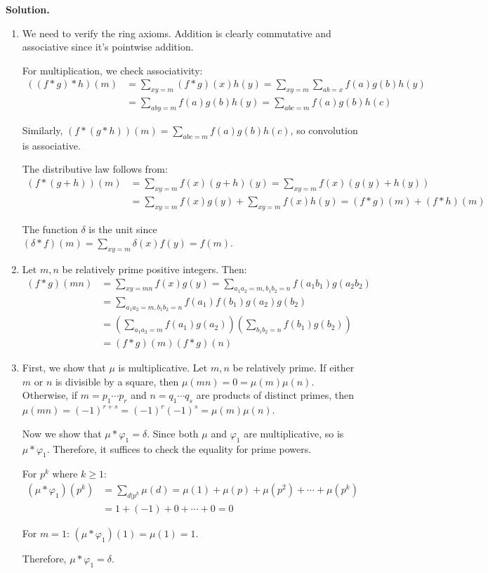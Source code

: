 \noindent\textbf{Solution.}
\begin{enumerate}[label=(\alph*)]
    \item We need to verify the ring axioms. Addition is clearly commutative and associative since it's pointwise addition.
    
    For multiplication, we check associativity:
    \begin{align*}
    ((f * g) * h)(m) &= \sum_{xy=m} (f * g)(x)h(y) = \sum_{xy=m} \sum_{ab=x} f(a)g(b)h(y) \\
    &= \sum_{aby=m} f(a)g(b)h(y) = \sum_{abc=m} f(a)g(b)h(c)
    \end{align*}
    
    Similarly, $(f * (g * h))(m) = \sum_{abc=m} f(a)g(b)h(c)$, so convolution is associative.
    
    The distributive law follows from:
    \begin{align*}
    (f * (g + h))(m) &= \sum_{xy=m} f(x)(g + h)(y) = \sum_{xy=m} f(x)(g(y) + h(y)) \\
    &= \sum_{xy=m} f(x)g(y) + \sum_{xy=m} f(x)h(y) = (f * g)(m) + (f * h)(m)
    \end{align*}
    
    The function $\delta$ is the unit since $(\delta * f)(m) = \sum_{xy=m} \delta(x)f(y) = f(m)$.
    
    \item Let $m, n$ be relatively prime positive integers. Then:
    \begin{align*}
    (f * g)(mn) &= \sum_{xy=mn} f(x)g(y) = \sum_{a_1a_2=m, b_1b_2=n} f(a_1b_1)g(a_2b_2) \\
    &= \sum_{a_1a_2=m, b_1b_2=n} f(a_1)f(b_1)g(a_2)g(b_2) \\
    &= \left(\sum_{a_1a_2=m} f(a_1)g(a_2)\right)\left(\sum_{b_1b_2=n} f(b_1)g(b_2)\right) \\
    &= (f * g)(m)(f * g)(n)
    \end{align*}
    
    \item First, we show that $\mu$ is multiplicative. Let $m, n$ be relatively prime. If either $m$ or $n$ is divisible by a square, then $\mu(mn) = 0 = \mu(m)\mu(n)$. Otherwise, if $m = p_1 \cdots p_r$ and $n = q_1 \cdots q_s$ are products of distinct primes, then $\mu(mn) = (-1)^{r+s} = (-1)^r(-1)^s = \mu(m)\mu(n)$.
    
    Now we show that $\mu * \varphi_1 = \delta$. Since both $\mu$ and $\varphi_1$ are multiplicative, so is $\mu * \varphi_1$. Therefore, it suffices to check the equality for prime powers.
    
    For $p^k$ where $k \geq 1$:
    \begin{align*}
    (\mu * \varphi_1)(p^k) &= \sum_{d|p^k} \mu(d) = \mu(1) + \mu(p) + \mu(p^2) + \cdots + \mu(p^k) \\
    &= 1 + (-1) + 0 + \cdots + 0 = 0
    \end{align*}
    
    For $m = 1$: $(\mu * \varphi_1)(1) = \mu(1) = 1$.
    
    Therefore, $\mu * \varphi_1 = \delta$.
\end{enumerate}

